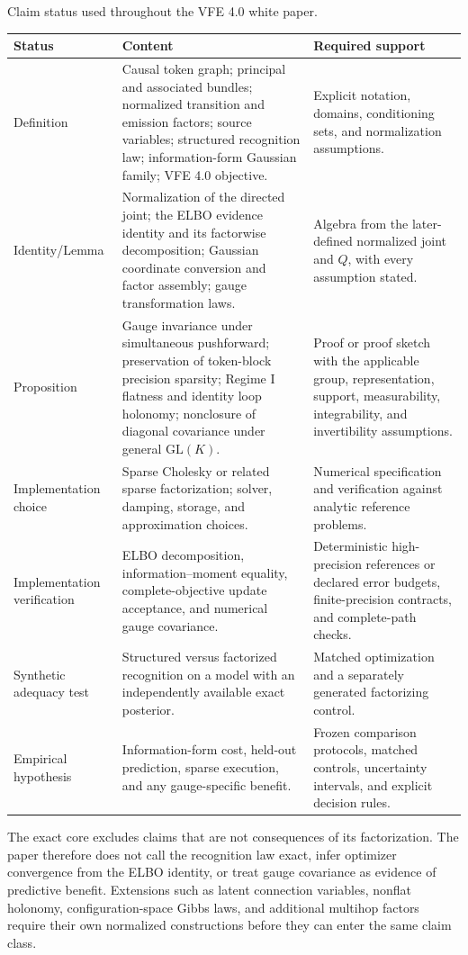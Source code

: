 \begin{sciencetable}{Claim status used throughout the VFE 4.0 white paper.}
\label{tab:claim-status}
\begin{tabularx}{\textwidth}{>{\raggedright\arraybackslash}p{} >{\raggedright\arraybackslash}X >{\raggedright\arraybackslash}p{}}
\toprule
\textbf{Status} & \textbf{Content} & \textbf{Required support} \\
\midrule
Definition & Causal token graph; principal and associated bundles; normalized transition and emission factors; source variables; structured recognition law; information-form Gaussian family; VFE 4.0 objective. & Explicit notation, domains, conditioning sets, and normalization assumptions. \\
\addlinespace
Identity/Lemma & Normalization of the directed joint; the ELBO evidence identity and its factorwise decomposition; Gaussian coordinate conversion and factor assembly; gauge transformation laws. & Algebra from the later-defined normalized joint and $Q$, with every assumption stated. \\
\addlinespace
Proposition & Gauge invariance under simultaneous pushforward; preservation of token-block precision sparsity; Regime I flatness and identity loop holonomy; nonclosure of diagonal covariance under general $\mathrm{GL}(K)$. & Proof or proof sketch with the applicable group, representation, support, measurability, integrability, and invertibility assumptions. \\
\addlinespace
Implementation choice & Sparse Cholesky or related sparse factorization; solver, damping, storage, and approximation choices. & Numerical specification and verification against analytic reference problems. \\
\addlinespace
Implementation verification & ELBO decomposition, information--moment equality, complete-objective update acceptance, and numerical gauge covariance. & Deterministic high-precision references or declared error budgets, finite-precision contracts, and complete-path checks. \\
\addlinespace
Synthetic adequacy test & Structured versus factorized recognition on a model with an independently available exact posterior. & Matched optimization and a separately generated factorizing control. \\
\addlinespace
Empirical hypothesis & Information-form cost, held-out prediction, sparse execution, and any gauge-specific benefit. & Frozen comparison protocols, matched controls, uncertainty intervals, and explicit decision rules. \\
\bottomrule
\end{tabularx}
\end{sciencetable}

The exact core excludes claims that are not consequences of its factorization. The paper therefore does not call the recognition law exact, infer optimizer convergence from the ELBO identity, or treat gauge covariance as evidence of predictive benefit. Extensions such as latent connection variables, nonflat holonomy, configuration-space Gibbs laws, and additional multihop factors require their own normalized constructions before they can enter the same claim class.

